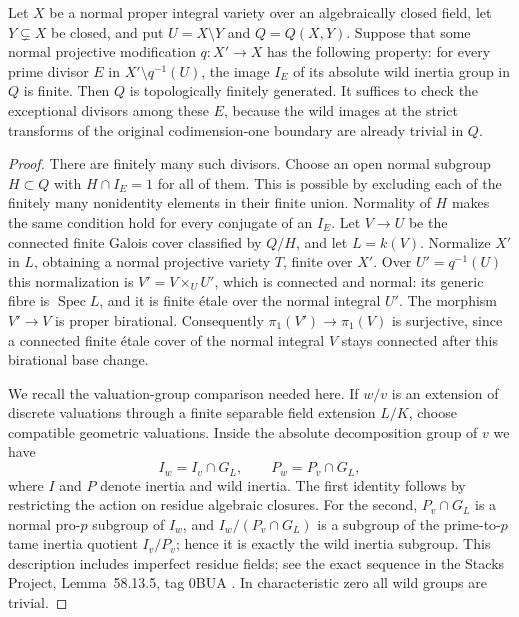 \begin{proposition}
\label{D:finite-exceptional-wild}
Let $X$ be a normal proper integral variety over an algebraically
closed field, let $Y\subsetneq X$ be closed, and put
$U=X\setminus Y$ and $Q=Q(X,Y)$.
Suppose that some normal projective modification $q:X'\to X$
has the following property: for every prime divisor $E$ in
$X'\setminus q^{-1}(U)$, the image $I_E$ of its absolute wild
inertia group in $Q$ is finite.  Then $Q$ is topologically
finitely generated.
It suffices to check the exceptional divisors among these $E$,
because the wild images at the strict transforms of the original
codimension-one boundary are already trivial in $Q$.
\end{proposition}
\begin{proof}
There are finitely many such divisors.  Choose an open normal
subgroup $H\subset Q$ with $H\cap I_E=1$ for all of them.
This is possible by excluding each of the finitely many nonidentity
elements in their finite union.  Normality of $H$ makes the same
condition hold for every conjugate of an $I_E$.
Let $V\to U$ be the connected finite Galois cover classified by
$Q/H$, and let $L=k(V)$.  Normalize $X'$ in $L$, obtaining a
normal projective variety $T$, finite over $X'$.  Over
$U'=q^{-1}(U)$ this normalization is
$V'=V\times_U U'$, which is connected and normal: its generic
fibre is $\operatorname{Spec}L$, and it is finite \'etale over
the normal integral $U'$.
The morphism $V'\to V$ is proper birational.  Consequently
$\pi_1(V')\to\pi_1(V)$ is surjective, since a connected finite
\'etale cover of the normal integral $V$ stays connected after
this birational base change.

We recall the valuation-group comparison needed here.  If $w/v$
is an extension of discrete valuations through a finite separable
field extension $L/K$, choose compatible geometric valuations.
Inside the absolute decomposition group of $v$ we have
\[
 I_w=I_v\cap G_L,\qquad P_w=P_v\cap G_L,
\]
where $I$ and $P$ denote inertia and wild inertia.  The first
identity follows by restricting the action on residue algebraic
closures.  For the second, $P_v\cap G_L$ is a normal pro-$p$
subgroup of $I_w$, and $I_w/(P_v\cap G_L)$ is a subgroup of the
prime-to-$p$ tame inertia quotient $I_v/P_v$; hence it is exactly
the wild inertia subgroup.  This description includes imperfect
residue fields; see the exact sequence in the Stacks Project,
Lemma~58.13.5, tag 0BUA \cite{StacksDTame}.  In characteristic zero all wild groups
are trivial.


\end{proof}
